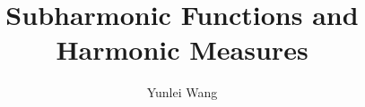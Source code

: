 \documentclass[12pt,reqno]{amsart}
\theoremstyle{definition}
\numberwithin{equation}{section}
\begin{document}
\title[Subharmonic Functions and Harmonic Measures]{Subharmonic Functions and Harmonic Measures}
\author[Y. Wang]{Yunlei Wang}


\maketitle


\end{document}
